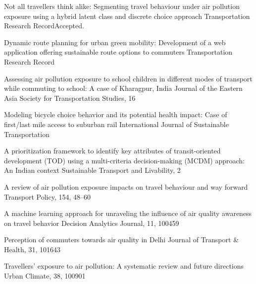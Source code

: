 \documentclass[10pt, a4paper]{article}
\begin{document}
\begin{cvlist}
    {Not all travellers think alike: Segmenting travel behaviour under air pollution exposure
     using a hybrid latent class and discrete choice approach}
    {Transportation Research Record}{Accepted. }

    {Dynamic route planning for urban green mobility: Development of a web application offering
     sustainable route options to commuters}
    {Transportation Research Record}{}

    {Assessing air pollution exposure to school children in different modes of transport while
     commuting to school: A case of Kharagpur, India}
    {Journal of the Eastern Asia Society for Transportation Studies, 16}
    {}

    {Modeling bicycle choice behavior and its potential health impact: Case of first/last mile
     access to suburban rail}
    {International Journal of Sustainable Transportation}{}

    {A prioritization framework to identify key attributes of transit-oriented development (TOD)
     using a multi-criteria decision-making (MCDM) approach: An Indian context}
    {Sustainable Transport and Livability, 2}{}

    {A review of air pollution exposure impacts on travel behaviour and way forward}
    {Transport Policy, 154, 48--60}{}

    {A machine learning approach for unraveling the influence of air quality awareness on travel
     behavior}
    {Decision Analytics Journal, 11, 100459}{}

    {Perception of commuters towards air quality in Delhi}
    {Journal of Transport \& Health, 31, 101643}{}

    {Travellers' exposure to air pollution: A systematic review and future directions}
    {Urban Climate, 38, 100901}{}
\end{cvlist}
\end{document}
